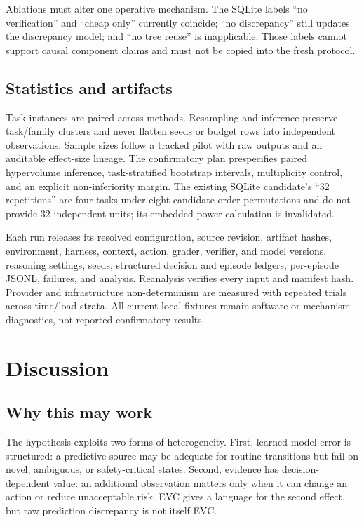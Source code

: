 \documentclass[10pt,twocolumn]{article}
\begin{document}
Ablations must alter one operative mechanism. The SQLite labels
``no verification'' and ``cheap only'' currently coincide; ``no discrepancy''
still updates the discrepancy model; and ``no tree reuse'' is inapplicable.
Those labels cannot support causal component claims and must not be copied into
the fresh protocol.

\subsection{Statistics and artifacts}

Task instances are paired across methods. Resampling and inference preserve
task/family clusters and never flatten seeds or budget rows into independent
observations. Sample sizes follow a tracked pilot with raw outputs and an
auditable effect-size lineage. The confirmatory plan prespecifies paired
hypervolume inference, task-stratified bootstrap intervals, multiplicity
control, and an explicit non-inferiority margin. The existing SQLite candidate's
``32 repetitions'' are four tasks under eight candidate-order permutations and
do not provide 32 independent units; its embedded power calculation is
invalidated.

Each run releases its resolved configuration, source revision, artifact hashes,
environment, harness, context, action, grader, verifier, and model versions,
reasoning settings, seeds, structured decision and episode ledgers,
per-episode JSONL, failures, and analysis. Reanalysis verifies every input and
manifest hash.
Provider and infrastructure non-determinism are measured with repeated trials
across time/load strata. All current local fixtures remain software or mechanism
diagnostics, not reported confirmatory results.

\section{Discussion}

\subsection{Why this may work}

The hypothesis exploits two forms of heterogeneity. First, learned-model error
is structured: a predictive source may be adequate for routine transitions but
fail on novel, ambiguous, or safety-critical states. Second, evidence has
decision-dependent value: an additional observation matters only when it can
change an action or reduce unacceptable risk. EVC gives a language for the
second effect, but raw prediction discrepancy is not itself EVC.
\end{document}

